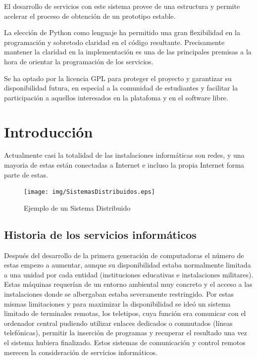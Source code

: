 \documentclass[a4paper,spanish,12pt]{book}
\begin{document}
El desarrollo de servicios con este sistema provee de una estructura y permite acelerar el proceso de obtención de un prototipo estable.

La elección de Python como lenguaje ha permitido una gran flexibilidad en la programación y sobretodo claridad en el código resultante. Precisamente mantener la claridad en la implementación es una de las principales premisas a la hora de orientar la programación de los servicios.

Se ha optado por la licencia GPL para proteger el proyecto y garantizar su disponibilidad futura, en especial a la comunidad de estudiantes y facilitar la participación a aquellos interesados en la platafoma y en el software libre.

\cleardoublepage


\pagestyle{plain}
\newpage
\tableofcontents
\newpage
\listoffigures
\cleardoublepage


\pagestyle{fancyplain}


\chapter{Introducción}
Actualmente casi la totalidad de las instalaciones inform\'aticas son redes, y una mayoria de estas est\'an conectadas a Internet e incluso la propia Internet forma parte de estas.
\begin{figure}[h] %
	\begin{center}
	\texttt{[image: img/SistemasDistribuidos.eps]}	
	\end{center}
	\caption{Ejemplo de un Sistema Distribuido}
	\label{fig:SistemasDistribuidos}
\end{figure}
\section{Historia de los servicios informáticos}
Despu\'es del desarrollo de la primera generación de computadoras el número de estas empezo a aumentar, aunque su disponibilidad estaba normalmente limitada a una unidad por cada entidad (instituciones educativas e instalaciones militares). Estas máquinas requerían de un entorno ambiental muy concreto y el acceso a las instalaciones donde se albergaban estaba severamente restringido. Por estas mismas limitaciones y para maximizar la disponibilidad se ideó un sistema limitado de terminales remotas, los teletipos, cuya función era comunicar con el ordenador central pudiendo utilizar enlaces dedicados o conmutados (líneas telefónicas), permitir la inserción de programas y recuperar el resultado una vez el sistema hubiera finalizado. Estos sistemas de comunicación y control remotos merecen la consideración de servicios informáticos.
\end{document}
